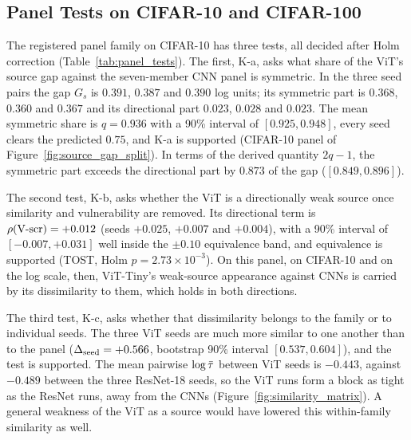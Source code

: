 \subsection{Panel Tests on CIFAR-10 and CIFAR-100}
\label{subsec:panel}

The registered panel family on CIFAR-10 has three tests, all decided after Holm correction (Table~\ref{tab:panel_tests}). The first, K-a, asks what share of the ViT's source gap against the seven-member CNN panel is symmetric. In the three seed pairs the gap $G_s$ is $0.391$, $0.387$ and $0.390$ log units; its symmetric part is $0.368$, $0.360$ and $0.367$ and its directional part $0.023$, $0.028$ and $0.023$. The mean symmetric share is $q = 0.936$ with a 90\% interval of $[0.925, 0.948]$, every seed clears the predicted $0.75$, and K-a is supported (CIFAR-10 panel of Figure~\ref{fig:source_gap_split}). In terms of the derived quantity $2q - 1$, the symmetric part exceeds the directional part by $0.873$ of the gap ($[0.849, 0.896]$).

The second test, K-b, asks whether the ViT is a directionally weak source once similarity and vulnerability are removed. Its directional term is $\rho(\mbox{V-scr}) = +0.012$ (seeds $+0.025$, $+0.007$ and $+0.004$), with a 90\% interval of $[-0.007, +0.031]$ well inside the $\pm0.10$ equivalence band, and equivalence is supported (TOST, Holm $p = 2.73\times10^{-3}$). On this panel, on CIFAR-10 and on the log scale, then, ViT-Tiny's weak-source appearance against CNNs is carried by its dissimilarity to them, which holds in both directions.

The third test, K-c, asks whether that dissimilarity belongs to the family or to individual seeds. The three ViT seeds are much more similar to one another than to the panel ($\Delta_{\mathrm{seed}} = +0.566$, bootstrap 90\% interval $[0.537, 0.604]$), and the test is supported. The mean pairwise $\log\bar{\tau}$ between ViT seeds is $-0.443$, against $-0.489$ between the three ResNet-18 seeds, so the ViT runs form a block as tight as the ResNet runs, away from the CNNs (Figure~\ref{fig:similarity_matrix}). A general weakness of the ViT as a source would have lowered this within-family similarity as well.

